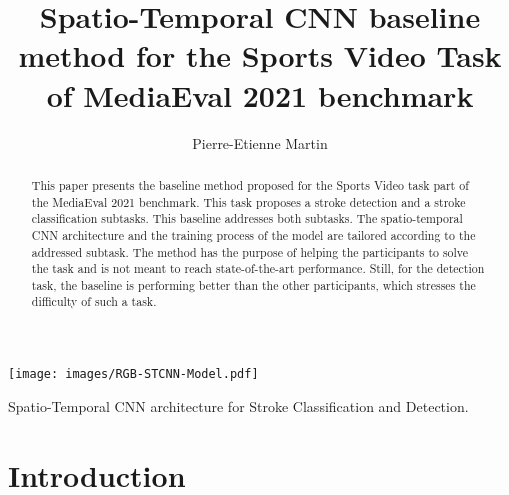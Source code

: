 \documentclass[sigconf]{acmart-me}
\begin{document}
\title{Spatio-Temporal CNN baseline method for the Sports Video Task of MediaEval 2021 benchmark}

\author{\vspace{-15pt}Pierre-Etienne Martin}



\renewcommand{\shorttitle}{Sports Video Task}

\begin{abstract}
This paper presents the baseline method proposed for the Sports Video task part of the MediaEval 2021 benchmark. This task proposes a stroke detection and a stroke classification subtasks. This baseline addresses both subtasks.
The spatio-temporal CNN architecture and the training process of the model are tailored according to the addressed subtask.
The method has the purpose of helping the participants to solve the task and is not meant to reach state-of-the-art performance. Still, for the detection task, the baseline is performing better than the other participants, which stresses the difficulty of such a task.
\vspace{-5pt}
\end{abstract}

\begin{teaserfigure}
\vspace{-16pt}
    \texttt{[image: images/RGB-STCNN-Model.pdf]}
    \vspace{-16pt}
    \caption{Spatio-Temporal CNN architecture for Stroke Classification and Detection.}
    \label{fig:dataset}
  \label{fig:teaser}
\end{teaserfigure}

\maketitle
\vspace{-8pt}
\section{Introduction}
\label{sec:intro}
\end{document}
